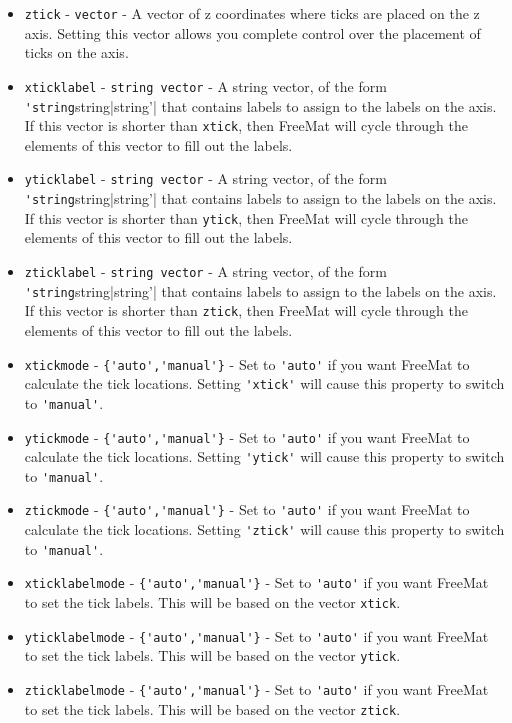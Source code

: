 \begin{itemize}
\item  \verb|ztick| - \verb|vector| - A vector of z coordinates where ticks are placed on the 
 z axis.  Setting this vector allows you complete control over the placement of ticks on 
 the axis.

\item  \verb|xticklabel| - \verb|string vector| - A string vector, of the form \verb|'string|string|string'|
 that contains labels to assign to the labels on the axis.  If this vector is shorter than
 \verb|xtick|, then FreeMat will cycle through the elements of this vector to fill out the labels.

\item  \verb|yticklabel| - \verb|string vector| - A string vector, of the form \verb|'string|string|string'|
 that contains labels to assign to the labels on the axis.  If this vector is shorter than
 \verb|ytick|, then FreeMat will cycle through the elements of this vector to fill out the labels.

\item  \verb|zticklabel| - \verb|string vector| - A string vector, of the form \verb|'string|string|string'|
 that contains labels to assign to the labels on the axis.  If this vector is shorter than
 \verb|ztick|, then FreeMat will cycle through the elements of this vector to fill out the labels.

\item  \verb|xtickmode| - \verb|{'auto','manual'}| - Set to \verb|'auto'| if you want FreeMat to calculate
 the tick locations.  Setting \verb|'xtick'| will cause this property to switch to \verb|'manual'|.

\item  \verb|ytickmode| - \verb|{'auto','manual'}| - Set to \verb|'auto'| if you want FreeMat to calculate
 the tick locations.  Setting \verb|'ytick'| will cause this property to switch to \verb|'manual'|.

\item  \verb|ztickmode| - \verb|{'auto','manual'}| - Set to \verb|'auto'| if you want FreeMat to calculate
 the tick locations.  Setting \verb|'ztick'| will cause this property to switch to \verb|'manual'|.

\item  \verb|xticklabelmode| - \verb|{'auto','manual'}| - Set to \verb|'auto'| if you want FreeMat to
 set the tick labels.  This will be based on the vector \verb|xtick|.

\item  \verb|yticklabelmode| - \verb|{'auto','manual'}| - Set to \verb|'auto'| if you want FreeMat to
 set the tick labels.  This will be based on the vector \verb|ytick|.

\item  \verb|zticklabelmode| - \verb|{'auto','manual'}| - Set to \verb|'auto'| if you want FreeMat to
 set the tick labels.  This will be based on the vector \verb|ztick|.

\end{itemize}
